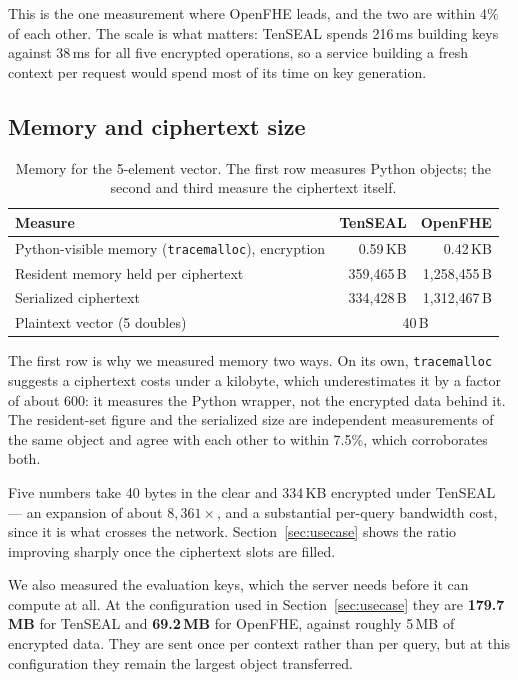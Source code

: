 \documentclass[11pt,a4paper]{article}
\begin{document}
This is the one measurement where OpenFHE leads, and the two are within 4\% of each
other. The scale is what matters: TenSEAL spends 216\,ms building keys against
38\,ms for all five encrypted operations, so a service building a fresh context per
request would spend most of its time on key generation.

\subsection{Memory and ciphertext size}

\begin{table}[H]\centering\small
\begin{tabular}{@{}lrr@{}}
\toprule
\textbf{Measure} & \textbf{TenSEAL} & \textbf{OpenFHE} \\
\midrule
Python-visible memory (\texttt{tracemalloc}), encryption & 0.59\,KB & 0.42\,KB \\
Resident memory held per ciphertext & 359{,}465\,B & 1{,}258{,}455\,B \\
Serialized ciphertext & 334{,}428\,B & 1{,}312{,}467\,B \\
Plaintext vector (5 doubles) & \multicolumn{2}{c}{40\,B} \\
\bottomrule
\end{tabular}
\caption{Memory for the 5-element vector. The first row measures Python objects; the
second and third measure the ciphertext itself.}
\end{table}

The first row is why we measured memory two ways. On its own, \texttt{tracemalloc}
suggests a ciphertext costs under a kilobyte, which underestimates it by a factor of
about 600: it measures the Python wrapper, not the encrypted data behind it. The
resident-set figure and the serialized size are independent measurements of the same
object and agree with each other to within 7.5\%, which corroborates both.

Five numbers take 40 bytes in the clear and 334\,KB encrypted under TenSEAL --- an
expansion of about $8{,}361\times$, and a substantial per-query bandwidth cost, since
it is what crosses the network. Section~\ref{sec:usecase} shows the ratio improving
sharply once the ciphertext slots are filled.

We also measured the evaluation keys, which the server needs before it can compute
at all. At the configuration used in Section~\ref{sec:usecase} they are
\textbf{179.7\,MB} for TenSEAL and \textbf{69.2\,MB} for OpenFHE, against roughly
5\,MB of encrypted data. They are sent once per context rather than per query, but at
this configuration they remain the largest object transferred.
\end{document}
